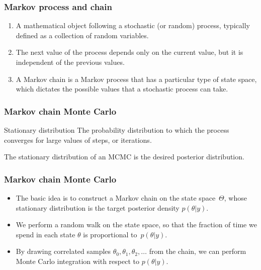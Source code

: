 \documentclass{beamer}
\newcommand{\1}{\ensuremath{\mathbf{1}}}
\begin{document}
%
%
%
\begin{frame}\frametitle{Markov process and chain}
	\begin{enumerate}
		\item A mathematical object following a stochastic (or random) process, typically defined as a collection of random variables.
		\item The next value of the process depends only on the current value, but it is independent of the previous values.
		\item A Markov chain is a Markov process that has a particular type of state space, which dictates the possible values that a stochastic process can take.
	\end{enumerate}
\end{frame}
%
%
%
\begin{frame}\frametitle{Markov chain Monte Carlo}
	\begin{block}{Stationary distribution}
		The probability distribution to which the process converges for large values of steps, or iterations.
	\end{block}
	The stationary distribution of an MCMC is the desired posterior distribution.
\end{frame}
%
%
%
\begin{frame}\frametitle{Markov chain Monte Carlo}
	\begin{itemize}
		\item The basic idea is to construct a Markov chain on the state space~$\Theta$, whose stationary distribution is the target posterior density $p(\theta|y)$.
		\item We perform a random walk on the state space, so that the fraction of time we spend in each state $\theta$ is proportional to~$p(\theta|y)$.
		\item By drawing correlated samples $\theta_0, \theta_1 , \theta_2 , \ldots$ from the chain, we can perform Monte Carlo integration with respect to $p(\theta|y)$.
	\end{itemize}
\end{frame}
\end{document}
